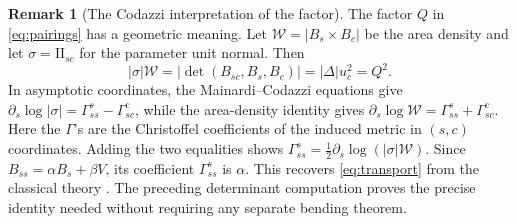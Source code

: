 \documentclass[11pt]{amsart}
\theoremstyle{definition}
\newtheorem{remark}[theorem]{Remark}
\begin{document}
\begin{remark}[The Codazzi interpretation of the factor]
\label{rem:codazzi}
The factor $Q$ in \eqref{eq:pairings} has a geometric meaning.
Let $\mathcal W=|B_s\times B_c|$ be the area density and
let $\sigma=\mathrm{II}_{sc}$ for the parameter unit normal.
Then
\[
 |\sigma|\mathcal W
   =|\det(B_{sc},B_s,B_c)|=|\Delta|u_c^2=Q^2.
\]
In asymptotic coordinates, the Mainardi--Codazzi equations give
$\partial_s\log|\sigma|=\Gamma^s_{ss}-\Gamma^c_{sc}$,
while the area-density identity gives
$\partial_s\log\mathcal W=\Gamma^s_{ss}+\Gamma^c_{sc}$.
Here the $\Gamma$'s are the Christoffel coefficients of the induced
metric in $(s,c)$ coordinates. Adding the two equalities shows
$\Gamma^s_{ss}=\frac12\partial_s\log(|\sigma|\mathcal W)$.
Since $B_{ss}=\alpha B_s+\beta V$, its coefficient
$\Gamma^s_{ss}$ is $\alpha$. This recovers
\eqref{eq:transport} from the classical theory
\cite[\S4-3]{doCarmo}. The preceding determinant computation
proves the precise identity needed without requiring any
separate bending theorem.
\end{remark}
\end{document}
